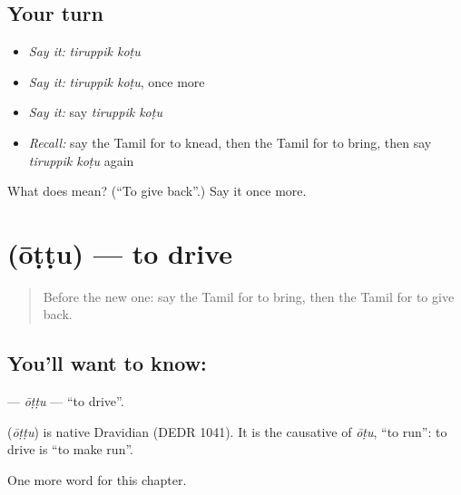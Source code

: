 \subsection*{Your turn}
\begin{itemize}
\raggedright
  \item \emph{Say it:} \emph{tiruppik koṭu}
  \item \emph{Say it:} \emph{tiruppik koṭu}, once more
  \item \emph{Say it:} say \emph{tiruppik koṭu}
  \item \emph{Recall:} say the Tamil for to knead, then the Tamil for to bring, then say \emph{tiruppik koṭu} again
\end{itemize}

\begin{tcolorbox}[breakable,colback=teal!4,colframe=teal!35!black,title={Before you move on}]
What does   mean? (\textquotedblleft{}To give back\textquotedblright{}.) Say it once more.
\end{tcolorbox}
\section[\texorpdfstring{\ta{ஓட்டு} (ōṭṭu)}{ஓட்டு (ōṭṭu)}]{ (ōṭṭu) — to drive}

\label{lesson:TA-C195-ottu2}



\begin{quote}
Before the new one: say the Tamil for to bring, then the Tamil for to give back.
\end{quote}

\subsection*{You'll want to know: }
\textbf{} — \emph{ōṭṭu} — \textquotedblleft{}to drive\textquotedblright{}.

\begin{cousinweb}
\textbf{} (\emph{ōṭṭu}) is native Dravidian (DEDR 1041). It is the causative of \emph{ōṭu}, \textquotedblleft{}to run\textquotedblright{}: to drive is \textquotedblleft{}to make run\textquotedblright{}.
\end{cousinweb}

\begin{grammarlens}[title={What you've built}]
One more word for this chapter.
\end{grammarlens}

